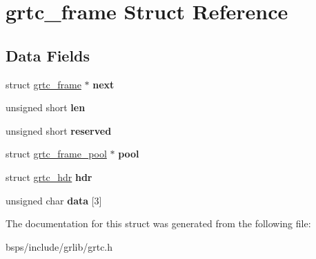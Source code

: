 \hypertarget{structgrtc__frame}{}\section{grtc\+\_\+frame Struct Reference}
\label{structgrtc__frame}
\subsection*{Data Fields}
\begin{DoxyCompactItemize}
\item 
\mbox{\label{structgrtc__frame_a547ba0d66f79d95ab467f988b1667099}} 
struct \mbox{\hyperlink{structgrtc__frame}{grtc\+\_\+frame}} $\ast$ {\bfseries next}
\item 
\mbox{\label{structgrtc__frame_a74ab6d5fefb359d03070aa8eefd028c1}} 
unsigned short {\bfseries len}
\item 
\mbox{\label{structgrtc__frame_a91678122decb93ab40210ea5161f42ca}} 
unsigned short {\bfseries reserved}
\item 
\mbox{\label{structgrtc__frame_a2a384a48cfd345ed758354d287779a5e}} 
struct \mbox{\hyperlink{structgrtc__frame__pool}{grtc\+\_\+frame\+\_\+pool}} $\ast$ {\bfseries pool}
\item 
\mbox{\label{structgrtc__frame_ac5a1a12e18dcf3f7aa1242b5ccc5e194}} 
struct \mbox{\hyperlink{structgrtc__hdr}{grtc\+\_\+hdr}} {\bfseries hdr}
\item 
\mbox{\label{structgrtc__frame_a24ba2fef1a0b2bce18a7a6fa9bbef7c7}} 
unsigned char {\bfseries data} \mbox{[}3\mbox{]}
\end{DoxyCompactItemize}


The documentation for this struct was generated from the following file\+:\begin{DoxyCompactItemize}
\item 
bsps/include/grlib/grtc.\+h\end{DoxyCompactItemize}
